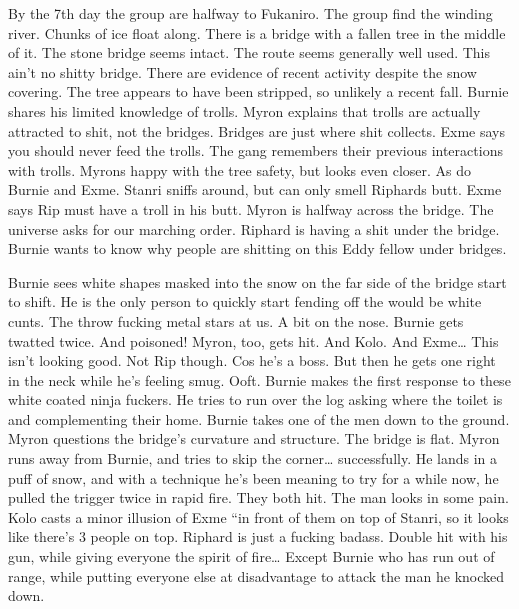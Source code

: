 \begin{multicols}{2}
By the 7th day the group are halfway to Fukaniro. The group find the winding river. Chunks of ice float along. There is a bridge with a fallen tree in the middle of it. The stone bridge seems intact. The route seems generally well used. This ain't no shitty bridge. There are evidence of recent activity despite the snow covering. The tree appears to have been stripped, so unlikely a recent fall. Burnie shares his limited knowledge of trolls. Myron explains that trolls are actually attracted to shit, not the bridges. Bridges are just where shit collects. Exme says you should never feed the trolls. The gang remembers their previous interactions with trolls. Myrons happy with the tree safety, but looks even closer. As do Burnie and Exme. Stanri sniffs around, but can only smell Riphards butt. Exme says Rip must have a troll in his butt. Myron is halfway across the bridge. The universe asks for our marching order. Riphard is having a shit under the bridge. Burnie wants to know why people are shitting on this Eddy fellow under bridges.\medskip

Burnie sees white shapes masked into the snow on the far side of the bridge start to shift. He is the only person to quickly start fending off the would be white cunts. The throw fucking metal stars at us. A bit on the nose. Burnie gets twatted twice. And poisoned! Myron, too, gets hit. And Kolo. And Exme… This isn’t looking good. Not Rip though. Cos he’s a boss. But then he gets one right in the neck while he’s feeling smug. Ooft. Burnie makes the first response to these white coated ninja fuckers. He tries to run over the log asking where the toilet is and complementing their home. Burnie takes one of the men down to the ground. Myron questions the bridge’s curvature and structure. The bridge is flat. Myron runs away from Burnie, and tries to skip the corner… successfully. He lands in a puff of snow, and with a technique he’s been meaning to try for a while now, he pulled the trigger twice in rapid fire. They both hit. The man looks in some pain. Kolo casts a minor illusion of Exme “in front of them on top of Stanri, so it looks like there’s 3 people on top. Riphard is just a fucking badass. Double hit with his gun, while giving everyone the spirit of fire… Except Burnie who has run out of range, while putting everyone else at disadvantage to attack the man he knocked down.\medskip


\end{multicols}
